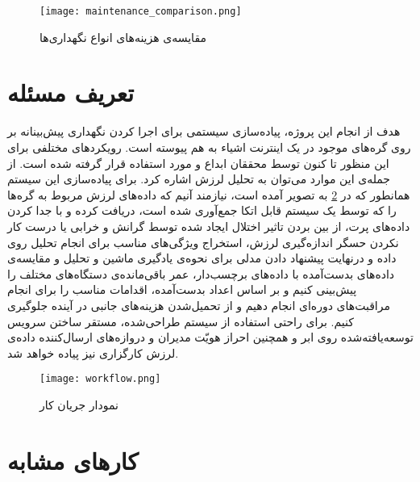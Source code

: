 \begin{figure}[!h]
\centerline{\texttt{[image: maintenance\_comparison.png]}}
\caption{مقایسه‌ی هزینه‌های انواع نگهد‌اری‌ها}
\label{fig:maintenance_comparison}
\end{figure}


\section{تعریف مسئله}
هدف از انجام این پروژه، پیاده‌سازی سیستمی برای اجرا کردن نگهداری پیش‌بینانه بر روی گره‌های موجود در یک اینترنت اشیاء به هم پیوسته است. رویکردهای مختلفی برای این منظور تا کنون توسط محققان ابداع و مورد استفاده قرار گرفته شده است. از جمله‌ی این موارد می‌توان به تحلیل لرزش اشاره کرد. برای پیاده‌سازی این سیستم همانطور که در \cref{fig:workflow} به تصویر آمده ‌است، نیازمند آنیم که داده‌های لرزش مربوط به گره‌ها را که توسط یک سیستم قابل اتکا جمع‌آوری شده است، دریافت کرده و با جدا کردن داده‌های پرت، از بین بردن تاثیر اختلال ایجاد شده توسط گرانش و خرابی یا درست‌ کار نکردن حسگر اندازه‌گیری لرزش، استخراج ویژگی‌های مناسب برای انجام تحلیل روی داده و درنهایت پیشنهاد دادن مدلی برای نحوه‌ی یادگیری ماشین و تحلیل و مقایسه‌ی داده‌های بدست‌آمده با داده‌های برچسب‌دار، عمر باقی‌مانده‌ی دستگاه‌های مختلف را پیش‌بینی کنیم و بر اساس اعداد بدست‌آمده، اقدامات مناسب را برای انجام مراقبت‌های دوره‌ای انجام دهیم و از تحمیل‌شدن هزینه‌های جانبی در آینده جلوگیری کنیم\cite{jung2017vibration}. برای راحتی استفاده از سیستم طراحی‌شده، مستقر ساختن سرویس توسعه‌یافته‌شده روی ابر و همچنین احراز هویّت مدیران و دروازه‌های ارسال‌کننده داده‌ی لرزش کارگزاری نیز پیاده خواهد شد.

\begin{figure}[!h]
\centerline{\texttt{[image: workflow.png]}}
\caption{نمودار جریان کار}
\label{fig:workflow}
\end{figure}


\section{کارهای مشابه}
